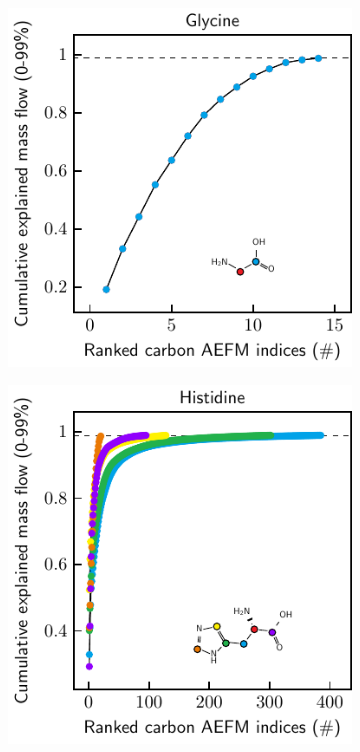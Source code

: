 \documentclass[]{article}
\begin{document}
\begin{figure}
    \begin{subfigure}[t]{0.247\textwidth}
        \caption{}
        \includegraphics[width=\textwidth]{subpanels/cumulative-source-met-15-legend.pdf}\\
    \end{subfigure}
    \begin{subfigure}[t]{0.247\textwidth}
        \caption{}
        \includegraphics[width=\textwidth]{subpanels/cumulative-source-met-18-legend.pdf}\\

\end{subfigure}
\end{figure}
\end{document}

